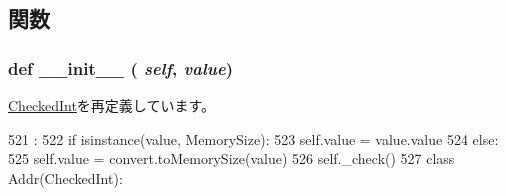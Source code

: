 \subsection{関数}
\hypertarget{classm5_1_1params_1_1MemorySize32_ac775ee34451fdfa742b318538164070e}{
\subsubsection[{\_\-\_\-init\_\-\_\-}]{\setlength{\rightskip}{0pt plus 5cm}def \_\-\_\-init\_\-\_\- ( {\em self}, \/   {\em value})}}
\label{classm5_1_1params_1_1MemorySize32_ac775ee34451fdfa742b318538164070e}


\hyperlink{classm5_1_1params_1_1CheckedInt_ac775ee34451fdfa742b318538164070e}{CheckedInt}を再定義しています。


\begin{DoxyCode}
521                              :
522         if isinstance(value, MemorySize):
523             self.value = value.value
524         else:
525             self.value = convert.toMemorySize(value)
526         self._check()
527 
class Addr(CheckedInt):
\end{DoxyCode}


